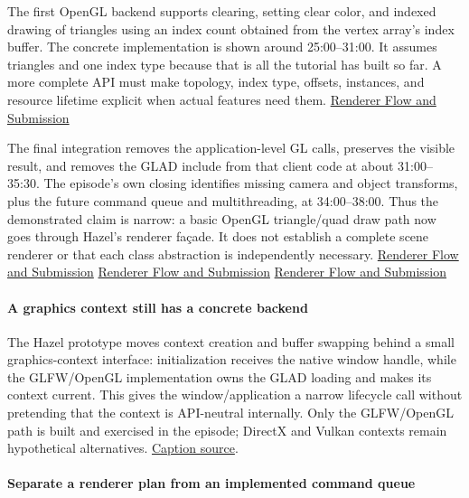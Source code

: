 The first OpenGL backend supports clearing, setting clear color, and indexed drawing of triangles using an index count obtained from the vertex array's index buffer. The concrete implementation is shown around 25:00--31:00. It assumes triangles and one index type because that is all the tutorial has built so far. A more complete API must make topology, index type, offsets, instances, and resource lifetime explicit when actual features need them. \href{https://www.youtube.com/watch?v=akxevYYWd9g&t=1500s}{Renderer Flow and Submission}

The final integration removes the application-level GL calls, preserves the visible result, and removes the GLAD include from that client code at about 31:00--35:30. The episode's own closing identifies missing camera and object transforms, plus the future command queue and multithreading, at 34:00--38:00. Thus the demonstrated claim is narrow: a basic OpenGL triangle/quad draw path now goes through Hazel's renderer façade. It does not establish a complete scene renderer or that each class abstraction is independently necessary. \href{https://www.youtube.com/watch?v=akxevYYWd9g&t=1860s}{Renderer Flow and Submission} \href{https://www.youtube.com/watch?v=akxevYYWd9g&t=2040s}{Renderer Flow and Submission} \href{https://www.youtube.com/watch?v=akxevYYWd9g&t=2220s}{Renderer Flow and Submission}

\paragraph{A graphics context still has a concrete backend}\label{a-graphics-context-still-has-a-concrete-backend}

The Hazel prototype moves context creation and buffer swapping behind a small graphics-context interface: initialization receives the native window handle, while the GLFW/OpenGL implementation owns the GLAD loading and makes its context current. This gives the window/application a narrow lifecycle call without pretending that the context is API-neutral internally. Only the GLFW/OpenGL path is built and exercised in the episode; DirectX and Vulkan contexts remain hypothetical alternatives. \href{https://www.youtube.com/watch?v=YZKEjaCnsjU}{Caption source}.

\paragraph{Separate a renderer plan from an implemented command queue}\label{separate-a-renderer-plan-from-an-implemented-command-queue}

